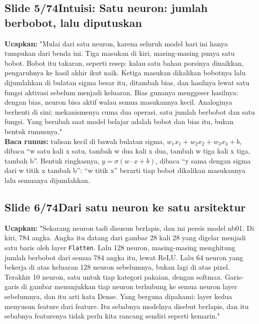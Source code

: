 \documentclass[11pt]{article}
\renewcommand{\framebox}[1]{\colorbox{acc!15}{\textcolor{acc}{\textbf{#1}}}}
\begin{document}
\subsection*{\framebox{Slide 5/74}\quad Intuisi: Satu neuron: jumlah berbobot, lalu diputuskan}
\textbf{Ucapkan:} "Mulai dari satu neuron, karena seluruh model hari ini hanya tumpukan dari benda ini. Tiga masukan di kiri, masing-masing punya satu bobot. Bobot itu takaran, seperti resep: kalau satu bahan porsinya dinaikkan, pengaruhnya ke hasil akhir ikut naik. Ketiga masukan dikalikan bobotnya lalu dijumlahkan di bulatan sigma besar itu, ditambah bias, dan hasilnya lewat satu fungsi aktivasi sebelum menjadi keluaran. Bias gunanya menggeser hasilnya: dengan bias, neuron bisa aktif walau semua masukannya kecil. Analoginya berhenti di sini; mekanismenya cuma dua operasi, satu jumlah berbobot dan satu fungsi. Yang berubah saat model belajar adalah bobot dan bias itu, bukan bentuk rumusnya."\\[2pt]
\textbf{Baca rumus:} tulisan kecil di bawah bulatan sigma, $w_1x_1+w_2x_2+w_3x_3+b$, dibaca ``w satu kali x satu, tambah w dua kali x dua, tambah w tiga kali x tiga, tambah b''. Bentuk ringkasnya, $y = \sigma(w \cdot x + b)$, dibaca ``y sama dengan sigma dari w titik x tambah b'': ``w titik x'' berarti tiap bobot dikalikan masukannya lalu semuanya dijumlahkan.\\[2pt]

\subsection*{\framebox{Slide 6/74}\quad Dari satu neuron ke satu arsitektur}
\textbf{Ucapkan:} "Sekarang neuron tadi disusun berlapis, dan ini persis model nb01. Di kiri, 784 angka. Angka itu datang dari gambar 28 kali 28 yang digelar menjadi satu baris oleh layer \texttt{Flatten}. Lalu 128 neuron, masing-masing menghitung jumlah berbobot dari semua 784 angka itu, lewat ReLU. Lalu 64 neuron yang bekerja di atas keluaran 128 neuron sebelumnya, bukan lagi di atas pixel. Terakhir 10 neuron, satu untuk tiap kategori pakaian, dengan softmax. Garis-garis di gambar menunjukkan tiap neuron terhubung ke semua neuron layer sebelumnya, dan itu arti kata Dense. Yang berguna dipahami: layer kedua menyusun feature dari feature. Itu sebabnya modelnya disebut berlapis, dan itu sebabnya featurenya tidak perlu kita rancang sendiri seperti kemarin."\\[2pt]
\end{document}
